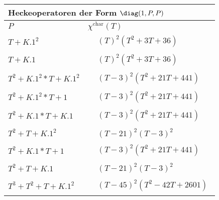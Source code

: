 \begin{tabular}{| l | l |}
\multicolumn{2}{l}{\bf Heckeoperatoren der Form $\diag(1,P,P)$} \\
\hline
$P$ & $\chi^\text{char}(T)$ \\
\hline
$T + K.1^2$ &
$\!\begin{aligned}
	&(T)^{2}(T^{2} + 3T + 36)\end{aligned}$ \\
\hline
$T + K.1$ &
$\!\begin{aligned}
	&(T)^{2}(T^{2} + 3T + 36)\end{aligned}$ \\
\hline
$T^2 + K.1^2*T + K.1^2$ &
$\!\begin{aligned}
	&(T - 3)^{2}(T^{2} + 21T + 441)\end{aligned}$ \\
\hline
$T^2 + K.1^2*T + 1$ &
$\!\begin{aligned}
	&(T - 3)^{2}(T^{2} + 21T + 441)\end{aligned}$ \\
\hline
$T^2 + K.1*T + K.1$ &
$\!\begin{aligned}
	&(T - 3)^{2}(T^{2} + 21T + 441)\end{aligned}$ \\
\hline
$T^2 + T + K.1^2$ &
$\!\begin{aligned}
	&(T - 21)^{2}(T - 3)^{2}\end{aligned}$ \\
\hline
$T^2 + K.1*T + 1$ &
$\!\begin{aligned}
	&(T - 3)^{2}(T^{2} + 21T + 441)\end{aligned}$ \\
\hline
$T^2 + T + K.1$ &
$\!\begin{aligned}
	&(T - 21)^{2}(T - 3)^{2}\end{aligned}$ \\
\hline
$T^3 + T^2 + T + K.1^2$ &
$\!\begin{aligned}
	&(T - 45)^{2}(T^{2} - 42T + 2601)\end{aligned}$ \\
\hline
\end{tabular}


